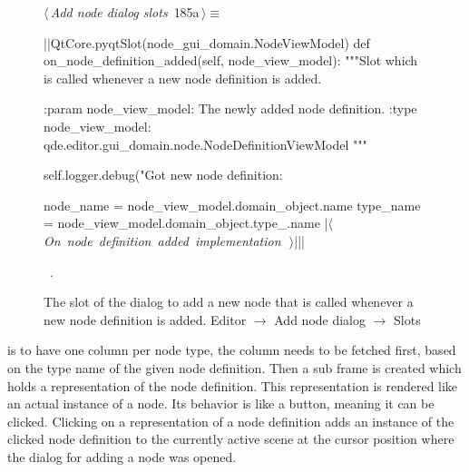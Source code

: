 \documentclass[%
    a4paper,    %
    justified,  %
    nobib,      %
    openany     %
]{tufte-book}
\makeatletter
\renewcommand{\label}[1]{\@tufte@label{##1}}%
\makeatother
\begin{document}
\begin{figure}[!htbp]
\begin{flushleft} \small
\begin{minipage}{\linewidth}\label{scrap159}\raggedright\small
{} $\langle\,${\itshape Add node dialog slots}\nobreak\ {\footnotesize {185a}}$\,\rangle\equiv$
\vspace{-1ex}
\begin{pythoncode}
|\normalfont{}\fontfamily{}|QtCore.pyqtSlot(node_gui_domain.NodeViewModel)
def on_node_definition_added(self, node_view_model):
    """Slot which is called whenever a new node definition is added.

    :param node_view_model: The newly added node definition.
    :type  node_view_model: qde.editor.gui_domain.node.NodeDefinitionViewModel
    """

    self.logger.debug("Got new node definition: %

    node_name = node_view_model.domain_object.name
    type_name = node_view_model.domain_object.type_.name
    |\hbox{$\langle\,${\itshape On node definition added implementation}\nobreak\ {\footnotesize {}}$\,\rangle$}||\NWsep|
\end{pythoncode}
\vspace{1.5ex}
\footnotesize
\begin{list}{}{\setlength{\itemsep}{-\parsep}\setlength{\itemindent}{-\leftmargin}}
\item \NWtxtMacroRefIn\ .

\item{}
\end{list}
\end{minipage}\vspace{4ex}
\end{flushleft}
\vspace*{-20mm}\caption{The slot of the dialog to add a new node that is called whenever a new
  node definition is added.
  \newline{}\newline{}Editor $\rightarrow$ Add node dialog $\rightarrow$ Slots}
\end{figure}

 is to have one column per node type, the
column needs to be fetched first, based on the type name of the given node
definition. Then a sub frame is created which holds a representation of the node
definition. This representation is rendered like an actual instance of a node.
Its behavior is like a button, meaning it can be clicked. Clicking on a
representation of a node definition adds an instance of the clicked node
definition to the currently active scene at the cursor position where the dialog
for adding a node was opened.
\end{document}
